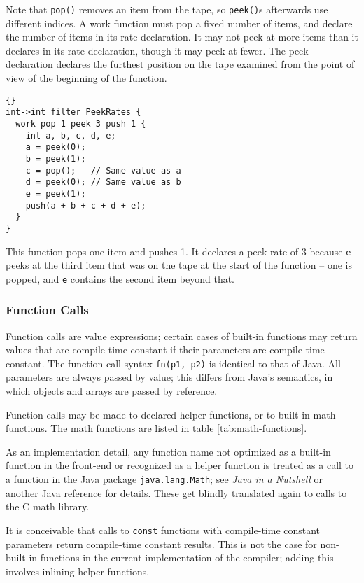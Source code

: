 \documentclass[11pt]{article}
\begin{document}
Note that \lstinline|pop()| removes an item from the tape, so
\lstinline|peek()|s afterwards use different indices.  A work function
must pop a fixed number of items, and declare the number of items in
its rate declaration.  It may not peek at more items than it declares
in its rate declaration, though it may peek at fewer.  The peek
declaration declares the furthest position on the tape examined from
the point of view of the beginning of the function.

\begin{lstlisting}{}
int->int filter PeekRates {
  work pop 1 peek 3 push 1 {
    int a, b, c, d, e;
    a = peek(0);
    b = peek(1);
    c = pop();   // Same value as a
    d = peek(0); // Same value as b
    e = peek(1);
    push(a + b + c + d + e);
  }
}
\end{lstlisting}

This function pops one item and pushes 1.  It declares a peek rate of
3 because \lstinline|e| peeks at the third item that was on the tape
at the start of the function -- one is popped, and \lstinline|e|
contains the second item beyond that.

\subsubsection{Function Calls}
\label{sec:expr-funcall}

Function calls are value expressions; certain cases of built-in
functions may return values that are compile-time constant if their
parameters are compile-time constant.  The function call syntax
\lstinline|fn(p1, p2)| is identical to that of Java.  All parameters are
always passed by value; this differs from Java's semantics, in which
objects and arrays are passed by reference.

Function calls may be made to declared helper functions, or to
built-in math functions.  The math functions are listed in table
\ref{tab:math-functions}.

\begin{note}
  As an implementation detail, any function name not optimized as a
  built-in function in the front-end or recognized as a helper
  function is treated as a call to a function in the Java package
  \lstinline|java.lang.Math|; see \emph{Java in a Nutshell} or another
  Java reference for details.  These get blindly translated again to
  calls to the C math library.
\end{note}

\begin{note}
  It is conceivable that calls to \lstinline|const| functions with
  compile-time constant parameters return compile-time constant
  results.  This is not the case for non-built-in functions in the
  current implementation of the compiler; adding this involves
  inlining helper functions.
\end{note}
\end{document}
